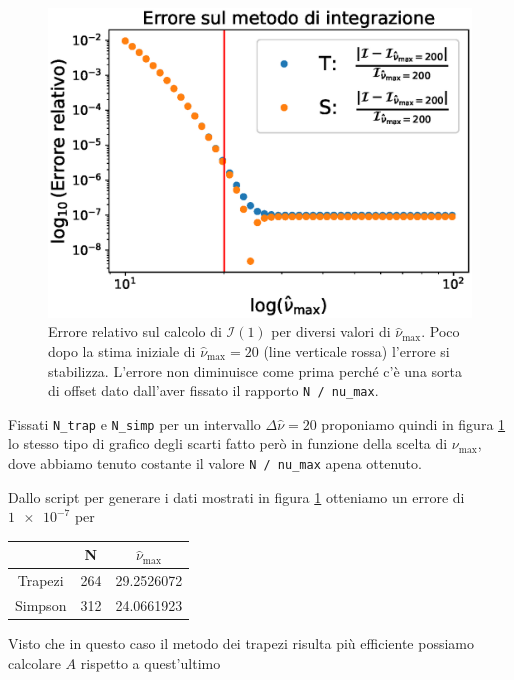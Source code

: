 \documentclass[a4paper, titlepage]{article}
\begin{document}
\begin{figure}[h]
\begin{minipage}{0.49 \textwidth}
        \includegraphics[width = \textwidth]{Figures/Pot_cvgA.eps}
        \caption{Errore relativo sul calcolo di $\mathcal I (1)$ per diversi
        valori di $\hat \nu_\text{max}$.
        Poco dopo la stima iniziale di  $\hat \nu_\text{max} = \num{20}$ (line
        verticale rossa) l'errore si stabilizza.
        L'errore non diminuisce come prima perché c'è una sorta di offset dato
        dall'aver fissato il rapporto \texttt{N / nu\_max}.}
        \label{fig:Pot_cvgA}
    \end{minipage}
\end{figure}

Fissati \texttt{N\_trap} e \texttt{N\_simp} per un intervallo
$\Delta \hat \nu = 20$ proponiamo quindi in figura \ref{fig:Pot_cvgA} lo stesso
tipo di grafico degli scarti fatto però in funzione della scelta di
$\nu_\text{max}$, dove abbiamo tenuto costante il valore \texttt{N / nu\_max}
apena ottenuto.

Dallo script per generare i dati mostrati in figura \ref{fig:Pot_cvgA} otteniamo
un errore di $\num{1e-7}$ per

\begin{table}[h]
    \centering
    \begin{tabular}{ccc}
         & N & $\hat \nu_\text{max}$ \\
        \hline
        Trapezi & 264 & 29.2526072 \\
        \hline
        Simpson & 312 & 24.0661923 \\
    \end{tabular}
\end{table}

Visto che in questo caso il metodo dei trapezi risulta più efficiente possiamo
calcolare $A$ rispetto a quest'ultimo
\end{document}
